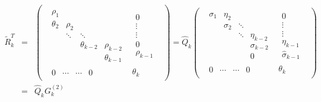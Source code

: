 \documentclass[11pt]{article}
\newcommand{\hQ}{\hat{Q}}
\begin{document}
\begin{eqnarray*}
\tilde{R}_k^T &=&
\begin{pmatrix}\begin{array}{c|c}
\begin{matrix}
  \rho_1  &          &         &      \\
  \theta_2   & \rho_2 &         &      \\
            & \ddots   & \ddots  &      \\
            &          & \theta_{k-2} & \rho_{k-2} \\
		        &          &         & \theta_{k-1}
 \end{matrix}
&  \begin{matrix} 0 \\ \vdots \\ \vdots \\ 0 \\ \rho_{k-1} \end{matrix} \\
\hline
\begin{matrix} 0 & \cdots  & \cdots & 0  \end{matrix} & \theta_{k}
\end{array}\end{pmatrix}
= \hQ_k
\begin{pmatrix}\begin{array}{c|c}
\begin{matrix}
 \sigma_1    & \eta_2 &         &      \\
            & \sigma_2   & \ddots  &      \\
            &          & \ddots  & \eta_{k-2}     \\
            &          &         & \sigma_{k-2} \\
		        &          &         & 0 
 \end{matrix}
&  \begin{matrix} 0 \\ \vdots \\ \vdots \\ \eta_{k-1} \\ \hat{\sigma}_{k-1} \end{matrix} \\
\hline
\begin{matrix} 0 & \cdots  & \cdots & 0  \end{matrix} & \theta_{k}
\end{array}\end{pmatrix} \\
 &=& \hQ_k G^{(2)}_k

\end{eqnarray*}
\end{document}
